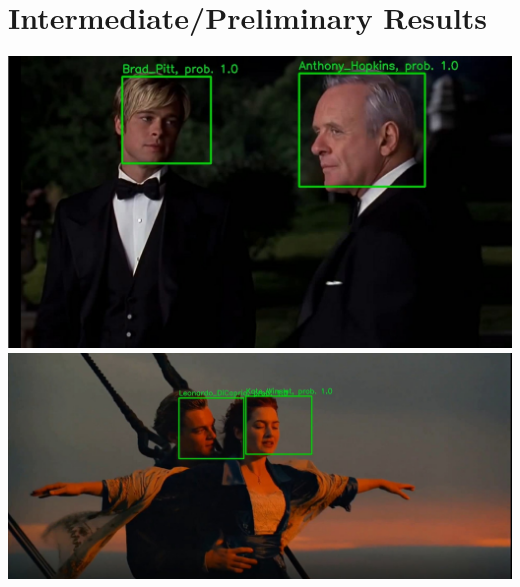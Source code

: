 \documentclass{article}
\begin{document}
\section{Intermediate/Preliminary Results}
\includegraphics[scale=0.2]{images/demo7.jpeg}  \\
\includegraphics[scale=0.2]{images/demo6.jpeg}\\  
\end{document}
